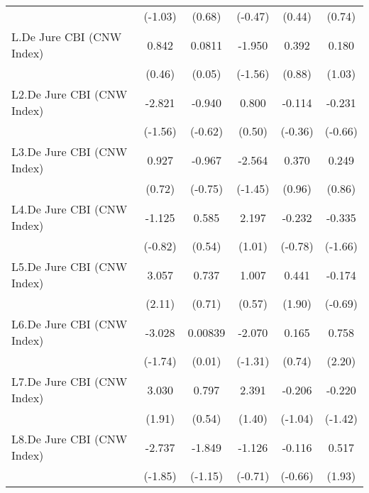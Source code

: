 {\begin{longtable}{l*{5}{c}}
                &  (-1.03)         &   (0.68)         &  (-0.47)         &   (0.44)         &   (0.74)         \\
[1em]
L.De Jure CBI (CNW Index)&    0.842         &   0.0811         &   -1.950         &    0.392         &    0.180         \\
                &   (0.46)         &   (0.05)         &  (-1.56)         &   (0.88)         &   (1.03)         \\
[1em]
L2.De Jure CBI (CNW Index)&   -2.821         &   -0.940         &    0.800         &   -0.114         &   -0.231         \\
                &  (-1.56)         &  (-0.62)         &   (0.50)         &  (-0.36)         &  (-0.66)         \\
[1em]
L3.De Jure CBI (CNW Index)&    0.927         &   -0.967         &   -2.564         &    0.370         &    0.249         \\
                &   (0.72)         &  (-0.75)         &  (-1.45)         &   (0.96)         &   (0.86)         \\
[1em]
L4.De Jure CBI (CNW Index)&   -1.125         &    0.585         &    2.197         &   -0.232         &   -0.335         \\
                &  (-0.82)         &   (0.54)         &   (1.01)         &  (-0.78)         &  (-1.66)         \\
[1em]
L5.De Jure CBI (CNW Index)&    3.057\sym{*}  &    0.737         &    1.007         &    0.441         &   -0.174         \\
                &   (2.11)         &   (0.71)         &   (0.57)         &   (1.90)         &  (-0.69)         \\
[1em]
L6.De Jure CBI (CNW Index)&   -3.028         &  0.00839         &   -2.070         &    0.165         &    0.758\sym{*}  \\
                &  (-1.74)         &   (0.01)         &  (-1.31)         &   (0.74)         &   (2.20)         \\
[1em]
L7.De Jure CBI (CNW Index)&    3.030         &    0.797         &    2.391         &   -0.206         &   -0.220         \\
                &   (1.91)         &   (0.54)         &   (1.40)         &  (-1.04)         &  (-1.42)         \\
[1em]
L8.De Jure CBI (CNW Index)&   -2.737         &   -1.849         &   -1.126         &   -0.116         &    0.517         \\
                &  (-1.85)         &  (-1.15)         &  (-0.71)         &  (-0.66)         &   (1.93)         \\

\end{longtable}}
